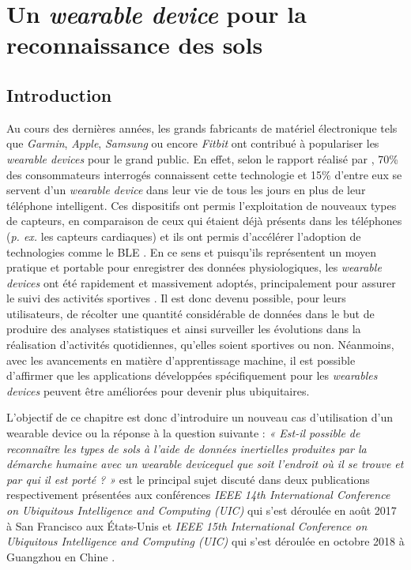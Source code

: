 \chapter{Un \textit{wearable device} pour la reconnaissance des sols}
\label{chap:4}

\section{Introduction}

Au cours des dernières années, les grands fabricants de matériel électronique tels que \textit{Garmin}, \textit{Apple}, \textit{Samsung} ou encore \textit{Fitbit} ont contribué à populariser les \textit{wearable devices} pour le grand public. En effet, selon le rapport réalisé par \cite{Nielsen2014}, 70\% des consommateurs interrogés connaissent cette technologie et 15\% d'entre eux se servent d'un \textit{wearable device} dans leur vie de tous les jours en plus de leur téléphone intelligent. Ces dispositifs ont permis l'exploitation de nouveaux types de capteurs, en comparaison de ceux qui étaient déjà présents dans les téléphones (\textit{p. ex.} les capteurs cardiaques) et ils ont permis d'accélérer l'adoption de technologies comme le \acs{BLE} \citep{Taplett}. En ce sens et puisqu'ils représentent un moyen pratique et portable pour enregistrer des données physiologiques,  les \textit{wearable devices} ont été rapidement et massivement adoptés, principalement pour assurer le suivi des activités sportives \citep{NPDGroup2015}. Il est donc devenu possible, pour leurs utilisateurs, de récolter une quantité considérable de données dans le but de produire des analyses statistiques et ainsi surveiller les évolutions dans la réalisation d'activités quotidiennes, qu'elles soient sportives ou non. Néanmoins, avec les avancements en matière d'apprentissage machine, il est possible d'affirmer que les applications développées spécifiquement pour les \textit{wearables devices} peuvent être améliorées pour devenir plus ubiquitaires.

L'objectif de ce chapitre est donc d'introduire un nouveau cas d'utilisation d'un wearable device ou la réponse à la question suivante : \textit{« Est-il possible de reconnaître les types de sols à l'aide de données inertielles produites par la démarche humaine avec un wearable device\textemdash quel que soit l'endroit où il se trouve et par qui il est porté ? »} est le principal sujet discuté dans deux publications respectivement présentées aux conférences \textit{IEEE 14th International Conference on Ubiquitous Intelligence and Computing (UIC)} qui s'est déroulée en août 2017 à San Francisco aux États-Unis \citep{Thullier2017a} et \textit{IEEE 15th International Conference on Ubiquitous Intelligence and Computing (UIC)} qui s'est déroulée en octobre 2018 à Guangzhou en Chine \citep{Thullier2018}.

